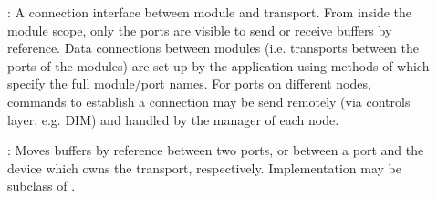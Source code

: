 \begin{description}
\item[] : 
A connection interface between module and transport. 
   From inside the module scope, only the ports are visible to send or  receive 
   buffers by reference. Data connections between modules 
   (i.e. transports between the ports of the modules) are set up by 
   the application using methods of  which specify the full 
   module/port names. For ports on different nodes, commands to establish 
   a connection may be send remotely (via controls layer, e.g. DIM) and 
   handled by the manager of each node.  

\item[] : 
Moves buffers by reference between two 
   ports, or between a port and the device which owns the 
   transport, respectively. Implementation may be subclass of .


\end{description}
